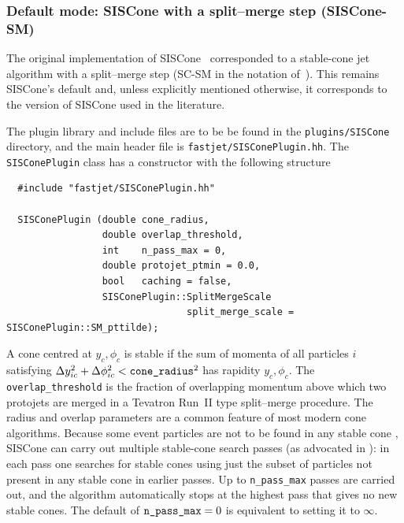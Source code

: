 \documentclass[12pt,a4]{article}
\newcommand{\order}[1]{{\cal O}\left(#1\right)}
\begin{document}
\subsubsection{Default mode: SISCone with a split--merge step (SISCone-SM)}

The original implementation of SISCone~\cite{SISCone} corresponded to
a stable-cone jet algorithm with a split--merge step (SC-SM in the
notation of~\cite{Salam:2009jx}).
%
This remains SISCone's default and, unless explicitly mentioned
otherwise, it corresponds to the version of SISCone used in the literature.


The plugin library and include files are to be be found in the
\verb:plugins/SISCone: directory, and the main header file is
\verb:fastjet/SISConePlugin.hh:. The \verb:SISConePlugin: class has a
constructor with the following structure
\begin{lstlisting}
  #include "fastjet/SISConePlugin.hh"

  SISConePlugin (double cone_radius,
                 double overlap_threshold,
                 int    n_pass_max = 0,
                 double protojet_ptmin = 0.0, 
                 bool   caching = false,
                 SISConePlugin::SplitMergeScale   
                                split_merge_scale = SISConePlugin::SM_pttilde);
\end{lstlisting}
A cone centred at $y_c,\phi_c$ is stable if the sum of momenta of all
particles $i$ satisfying $\Delta y_{ic}^2 + \Delta \phi_{ic}^2 <
\verb:cone_radius:^2$ has rapidity $y_c,\phi_c$.
%
The \verb:overlap_threshold: is the fraction of overlapping momentum
above which two protojets are merged in a Tevatron Run~II type
\cite{RunII-jet-physics} split--merge procedure.
The
radius and overlap parameters are a common feature of most modern cone
algorithms. Because some event particles are not to be found in any
stable cone \cite{EHT}, SISCone can carry out multiple stable-cone
search passes (as advocated in \cite{TeV4LHC}): in each pass one
searches for stable cones using just the subset of particles not
present in any stable cone in earlier passes. Up to \verb:n_pass_max:
passes are carried out, and the algorithm automatically stops at the
highest pass that gives no new stable cones. The default of
$\verb:n_pass_max: = 0$ is equivalent to setting it to $\infty$.
\end{document}

